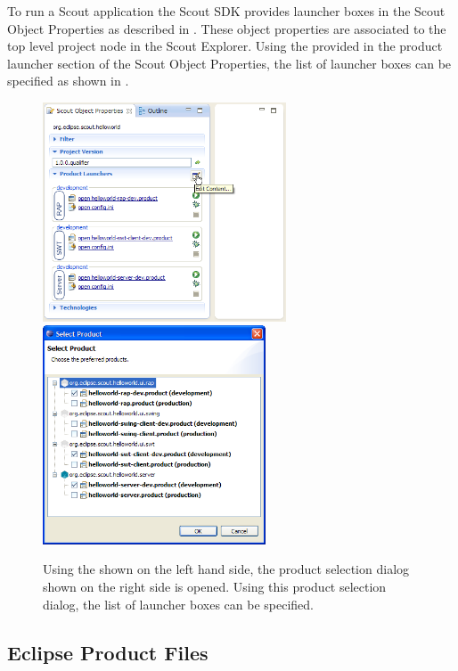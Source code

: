 \documentclass[a4paper,10pt,twoside]{book}
\begin{document}
To run a Scout application the Scout SDK provides launcher boxes in the Scout Object Properties as described in .
These object properties are associated to the top level project node in the Scout Explorer.
Using the  provided in the product launcher section of the Scout Object Properties, the list of launcher boxes can be specified as shown in .

\begin{figure}
\includegraphics[height=6.5cm]{sdk_edit_product_launcher.png} \hspace{0.5cm}
\includegraphics[height=6.5cm]{sdk_select_product_launcher.png}
\caption{Using the  shown on the left hand side, the product selection dialog shown on the right side is opened.
Using this product selection dialog, the list of launcher boxes can be specified.
}
\end{figure}

\subsection{Eclipse Product Files}
\end{document}
